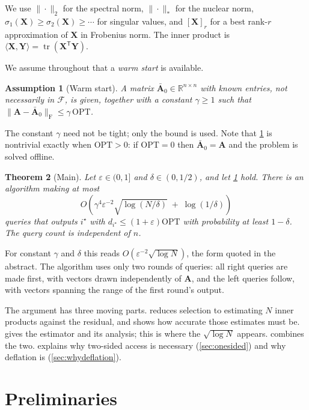 \documentclass{article}
\renewcommand{\vec}[1]{\mathbf{#1}}          %
\newcommand{\T}{\mathsf{T}}                  %
\newcommand{\F}{\mathrm{F}}                  %
\newcommand{\eps}{\varepsilon}
\newcommand{\cF}{\mathcal{F}}
\newcommand{\OPT}{\mathrm{OPT}}
\newcommand{\inner}[2]{\langle #1, #2 \rangle}
\DeclareMathOperator{\tr}{tr}
\newtheorem{theorem}{Theorem}[section]
\newtheorem{assumption}[theorem]{Assumption}
\theoremstyle{remark}
\begin{document}
We use $\|\cdot\|_2$ for the spectral norm, $\|\cdot\|_*$ for the nuclear norm, $\sigma_1(\vec{X}) \ge \sigma_2(\vec{X}) \ge \cdots$ for singular values, and $[\vec{X}]_r$ for a best rank-$r$ approximation of $\vec{X}$ in Frobenius norm.
The inner product is $\inner{\vec{X}}{\vec{Y}} = \tr(\vec{X}^\T\vec{Y})$.

We assume throughout that a \emph{warm start} is available.

\begin{assumption}[Warm start]\label{asm:warm}
A matrix $\bar{\vec{A}}_0 \in \mathbb{R}^{n \times n}$ with known entries, not necessarily in $\cF$, is given, together with a constant $\gamma \ge 1$ such that $\|\vec{A} - \bar{\vec{A}}_0\|_\F \le \gamma\,\OPT$.
\end{assumption}

The constant $\gamma$ need not be tight; only the bound is used.
Note that \cref{asm:warm} is nontrivial exactly when $\OPT > 0$: if $\OPT = 0$ then $\bar{\vec{A}}_0 = \vec{A}$ and the problem is solved offline.

\begin{theorem}[Main]\label{thm:main}
Let $\eps \in (0,1]$ and $\delta \in (0,1/2)$, and let \cref{asm:warm} hold.
There is an algorithm making at most
\[
O\!\left( \gamma^4\eps^{-2}\sqrt{\log(N/\delta)} \;+\; \log(1/\delta) \right)
\]
queries that outputs $i^\star$ with $d_{i^\star} \le (1+\eps)\OPT$ with probability at least $1-\delta$.
The query count is independent of $n$.
\end{theorem}

For constant $\gamma$ and $\delta$ this reads $O(\eps^{-2}\sqrt{\log N})$, the form quoted in the abstract.
The algorithm uses only two rounds of queries: all right queries are made first, with vectors drawn independently of $\vec{A}$, and the left queries follow, with vectors spanning the range of the first round's output.

The argument has three moving parts.
 reduces selection to estimating $N$ inner products against the residual, and shows how accurate those estimates must be.
 gives the estimator and its analysis; this is where the $\sqrt{\log N}$ appears.
 combines the two.
 explains why two-sided access is necessary (\cref{sec:onesided}) and why deflation is (\cref{sec:whydeflation}).

\section{Preliminaries}\label{sec:prelim}
\end{document}
